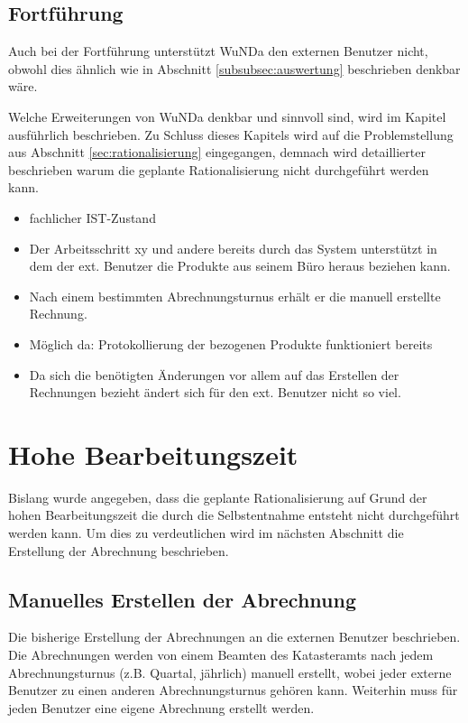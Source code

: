 \subsection{Fortführung}
Auch bei der Fortführung unterstützt \ac{WuNDa} den externen Benutzer nicht, obwohl dies ähnlich wie in Abschnitt \ref{subsubsec:auswertung} beschrieben denkbar wäre.

Welche Erweiterungen von \ac{WuNDa} denkbar und sinnvoll sind, wird im Kapitel  ausführlich beschrieben. Zu Schluss dieses Kapitels wird auf die Problemstellung aus Abschnitt \ref{sec:rationalisierung} eingegangen, demnach wird detaillierter beschrieben warum die geplante Rationalisierung nicht durchgeführt werden kann.

\begin{itemize}
	\item fachlicher IST-Zustand
	\item Der Arbeitsschritt xy und andere bereits durch das System unterstützt in dem der ext. Benutzer die Produkte aus seinem Büro heraus beziehen kann.
	\item Nach einem bestimmten Abrechnungsturnus erhält er die manuell erstellte Rechnung.
	\item Möglich da: Protokollierung der bezogenen Produkte funktioniert bereits
	\item Da sich die benötigten Änderungen vor allem auf das Erstellen der Rechnungen bezieht ändert sich für den ext. Benutzer nicht so viel.
\end{itemize}

\section{Hohe Bearbeitungszeit}

Bislang wurde angegeben, dass die geplante Rationalisierung auf Grund der hohen Bearbeitungszeit die durch die Selbstentnahme entsteht nicht durchgeführt werden kann. Um dies zu verdeutlichen wird im nächsten Abschnitt die Erstellung der Abrechnung beschrieben. 

\subsection{Manuelles Erstellen der Abrechnung} \label{subsec:erstellen_abrechnung}
Die bisherige Erstellung der Abrechnungen an die externen Benutzer beschrieben. Die Abrechnungen werden von einem Beamten des Katasteramts nach jedem Abrechnungsturnus (z.B. Quartal, jährlich) manuell erstellt, wobei jeder externe Benutzer zu einen anderen Abrechnungsturnus gehören kann.
Weiterhin muss für jeden Benutzer eine eigene Abrechnung erstellt werden.

